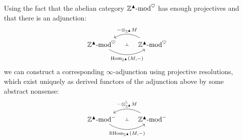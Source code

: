             \begin{remark} \label{remark: derived_tensor_products_and_homs_for_condensed_abelian_groups}
                Using the fact that the abelian category $\mathbb{Z}^{\blacktriangle}\text{-}\mathrm{mod}^{\heartsuit}$ has enough projectives and that there is an adjunction:
                    $$
                        \begin{tikzcd}
                            {\Z^{\cond}\mod^{\heart}} & {\Z^{\cond}\mod^{\heart}}
                            \arrow[""{name=0, anchor=center, inner sep=0}, "{\Hom_{\Z^{\cond}}(M, -)}"', bend right, from=1-1, to=1-2]
                            \arrow[""{name=1, anchor=center, inner sep=0}, "{- \tensor_{\Z^{\cond}} M}"', bend right, from=1-2, to=1-1]
                            \arrow["\dashv"{anchor=center, rotate=-90}, draw=none, from=1, to=0]
                        \end{tikzcd}
                    $$
                we can construct a corresponding $\infty$-adjunction using projective resolutions, which exist uniquely as derived functors of the adjunction above by some abstract nonsense:
                    $$
                        \begin{tikzcd}
                            {\Z^{\cond}\mod^-} & {\Z^{\cond}\mod^-}
                            \arrow[""{name=0, anchor=center, inner sep=0}, "{\R\Hom_{\Z^{\cond}}(M, -)}"', bend right, from=1-1, to=1-2]
                            \arrow[""{name=1, anchor=center, inner sep=0}, "{- \tensor_{\Z^{\cond}}^{\L} M}"', bend right, from=1-2, to=1-1]
                            \arrow["\dashv"{anchor=center, rotate=-90}, draw=none, from=1, to=0]
                        \end{tikzcd}
                    $$
            \end{remark}
